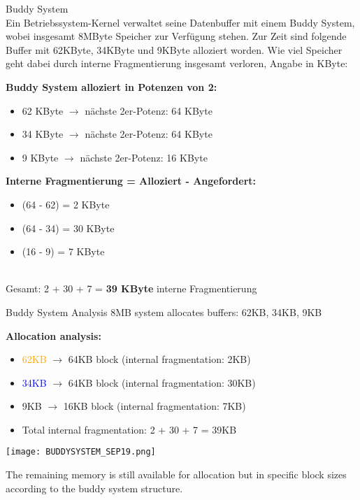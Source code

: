 \begin{example2}{Buddy System}\\
    Ein Betriebssystem-Kernel verwaltet seine Datenbuffer mit einem Buddy System, wobei insgesamt 8MByte Speicher zur Verfügung stehen. Zur Zeit sind folgende Buffer mit 62KByte, 34KByte und 9KByte alloziert worden. Wie viel Speicher geht dabei durch interne Fragmentierung insgesamt verloren, Angabe in KByte:
    \vspace{2mm}\\
    \begin{minipage}{0.5\linewidth}
    \textbf{Buddy System alloziert in Potenzen von 2:}    
    \begin{itemize}
        \item 62 KByte $\rightarrow$ nächste 2er-Potenz: 64 KByte
        \item 34 KByte $\rightarrow$ nächste 2er-Potenz: 64 KByte  
        \item 9 KByte $\rightarrow$ nächste 2er-Potenz: 16 KByte
    \end{itemize}
    \end{minipage}
    \begin{minipage}{0.5\linewidth}
    \textbf{Interne Fragmentierung = Alloziert - Angefordert:}
    \begin{itemize}
        \item (64 - 62) = 2 KByte
        \item (64 - 34) = 30 KByte
        \item (16 - 9) = 7 KByte
    \end{itemize}
    \end{minipage}
    \vspace{2mm}\\
    Gesamt: 2 + 30 + 7 = \textbf{39 KByte} interne Fragmentierung
\end{example2}

\begin{example2}{Buddy System Analysis}
    8MB system allocates buffers: 62KB, 34KB, 9KB
    
    \textbf{Allocation analysis:}
    \begin{itemize}
        \item \textcolor{orange}{62KB} $\rightarrow$ 64KB block (internal fragmentation: 2KB)
        \item \textcolor{blue}{34KB} $\rightarrow$ 64KB block (internal fragmentation: 30KB)
        \item \textcolor{frog}{9KB} $\rightarrow$ 16KB block (internal fragmentation: 7KB)
        \item Total internal fragmentation: 2 + 30 + 7 = 39KB
    \end{itemize}

    \texttt{[image: BUDDYSYSTEM\_SEP19.png]}
    
    The remaining memory is still available for allocation but in specific block sizes according to the buddy system structure.
\end{example2}





